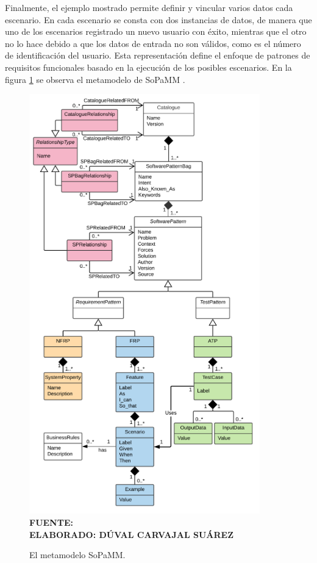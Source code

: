 Finalmente, el ejemplo mostrado permite definir y vincular varios datos cada escenario. En cada escenario se consta con dos instancias de datos, de manera que uno de los escenarios registrado un nuevo usuario con éxito, mientras que el otro no lo hace debido a que los datos de entrada no son válidos, como es el número de identificación del usuario. Esta representación define el enfoque de patrones de requisitos funcionales basado en la ejecución de los posibles escenarios. En la figura \ref{fig:metamodelo_sopamm} se observa el metamodelo de SoPaMM \cite{Mohamed}.

\begin{figure}[h!]
	\caption{El metamodelo SoPaMM.}
	\includegraphics[width=10cm]{img/metamodelosopamm.png}
	\label{fig:metamodelo_sopamm}
	\textbf{\\ FUENTE: \cite{Mohamed} \\ ELABORADO: DÚVAL CARVAJAL SUÁREZ}
\end{figure}


